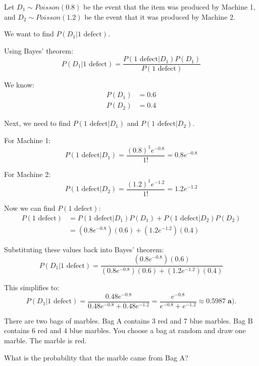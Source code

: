 \documentclass[a4paper, 10pt]{article}
\begin{document}
\begin{solution}
	Let \( D_1 \sim Poisson(0.8) \) be the event that the item was produced by Machine 1,
	and \( D_2 \sim Poisson(1.2) \) be the event that it was produced by Machine 2.

	\myspace

	\par\noindent We want to find \( P(D_1 | 1 \text{ defect}) \).

	Using Bayes' theorem:
	\[
		P(D_1 | 1 \text{ defect}) = \frac{P(1 \text{ defect} | D_1) P(D_1)}{P(1 \text{ defect})}
	\]

	We know:
	\begin{align*}
		P(D_1) & = 0.6 \\
		P(D_2) & = 0.4
	\end{align*}

	Next, we need to find \( P(1 \text{ defect} | D_1) \) and \( P(1 \text{ defect} | D_2) \).

	For Machine 1:
	\[
		P(1 \text{ defect} | D_1) = \frac{(0.8)^1 e^{-0.8}}{1!} = 0.8 e^{-0.8}
	\]

	For Machine 2:
	\[
		P(1 \text{ defect} | D_2) = \frac{(1.2)^1 e^{-1.2}}{1!} = 1.2 e^{-1.2}
	\]

	Now we can find \( P(1 \text{ defect}) \):
	\begin{align*}
		P(1 \text{ defect}) & = P(1 \text{ defect} | D_1) P(D_1) + P(1 \text{ defect} | D_2) P(D_2) \\
		                    & = (0.8 e^{-0.8})(0.6) + (1.2 e^{-1.2})(0.4)
	\end{align*}

	Substituting these values back into Bayes' theorem:
	\[
		P(D_1 | 1 \text{ defect}) = \frac{(0.8 e^{-0.8})(0.6)}{(0.8 e^{-0.8})(0.6) + (1.2 e^{-1.2})(0.4)}
	\]

	This simplifies to:
	\[
		P(D_1 | 1 \text{ defect}) = \frac{0.48 e^{-0.8}}{0.48 e^{-0.8} + 0.48 e^{-1.2}} = \frac{e^{-0.8}}{e^{-0.8} + e^{-1.2}}
		\approx \boxed{0.5987} \; \textbf{a).}
	\]
\end{solution}

\begin{problem}
There are two bags of marbles. Bag A contains 3 red and 7 blue marbles.
Bag B contains 6 red and 4 blue marbles. You choose a bag at random and draw one marble. The marble is red.
\begin{subproblems_alpha}
	\item What is the probability that the marble came from Bag A?
\end{subproblems_alpha}
\end{problem}
\end{document}
